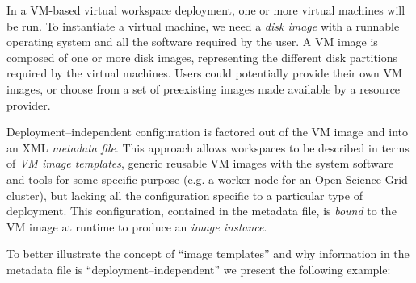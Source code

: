 \documentclass[singlespace]{ccw_chithesis}
\begin{document}
In a VM-based virtual workspace deployment, one or more virtual machines will be run. To instantiate a virtual machine, we need a \emph{disk image} with a runnable operating system and all the software required by the user. A VM image is composed of one or more disk images, representing the different disk partitions required by the virtual machines. Users could potentially provide their own VM images, or choose from a set of preexisting images made available by a resource provider.

Deployment--independent configuration is factored out of the VM image and into an XML \emph{metadata file}. This approach allows workspaces to be described in terms of \emph{VM image templates}, generic reusable VM images with the system software and tools for some specific purpose (e.g. a worker node for an Open Science Grid cluster), but lacking all the configuration specific to a particular type of deployment. This configuration, contained in the metadata file, is \emph{bound} to the VM image at runtime to produce an \emph{image instance}.

To better illustrate the concept of ``image templates'' and why information in the metadata file is ``deployment--independent'' we present the following example:
\end{document}
